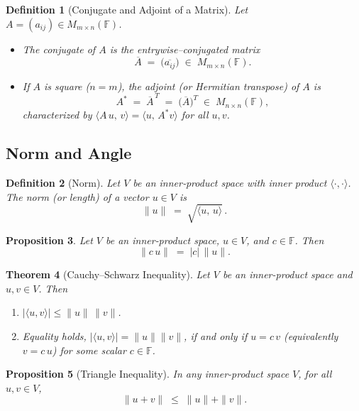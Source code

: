 \documentclass[12pt]{article}
\theoremstyle{break}             %
\newtheorem{thm}{Theorem}          %
\newtheorem{prop}[thm]{Proposition}%
\newtheorem{defn}[thm]{Definition}
\begin{document}
\begin{defn}[Conjugate and Adjoint of a Matrix]
Let \(A = (a_{ij})\in M_{m\times n}(\mathbb{F})\).  
\begin{itemize}
  \item The \emph{conjugate} of \(A\) is the entrywise–conjugated matrix
    \[
      \overline{A} \;=\;\bigl(\overline{a_{ij}}\bigr)
      \;\in\;M_{m\times n}(\mathbb{F}).
    \]
  \item If \(A\) is square (\(n=m\)), the \emph{adjoint} (or Hermitian transpose) of \(A\) is
    \[
      A^* \;=\;\overline{A}^{\,T}
      \;=\;\bigl(\overline{A}\bigr)^{T}
      \;\in\;M_{n\times n}(\mathbb{F}),
    \]
    characterized by \(\langle A\,u,\,v\rangle = \langle u,\,A^*v\rangle\) for all \(u,v\).
\end{itemize}
\end{defn}

\subsection{Norm and Angle}

\begin{defn}[Norm]
Let \(V\) be an inner‐product space with inner product \(\langle\cdot,\cdot\rangle\).  The \emph{norm} (or length) of a vector \(u\in V\) is
\[
\|u\|
\;=\;
\sqrt{\langle u,\,u\rangle}\,.
\]
\end{defn}

\begin{prop}
Let $V$ be an inner‐product space, $u\in V$, and $c\in\mathbb F$.  Then
\[
\|c\,u\| \;=\; |c|\,\|u\|.
\]
\end{prop}

\begin{thm}[Cauchy–Schwarz Inequality]
Let \(V\) be an inner-product space and \(u,v\in V\). Then
\begin{enumerate}
  \item \(\displaystyle \bigl\lvert\langle u,v\rangle\bigr\rvert \le \|u\|\,\|v\|\).
  \item Equality holds, \(\lvert\langle u,v\rangle\rvert = \|u\|\|v\|\), if and only if 
  \(u = c\,v\) (equivalently \(v = c\,u\)) for some scalar \(c\in\mathbb F\).
\end{enumerate}
\end{thm}

\begin{prop}[Triangle Inequality]
In any inner-product space \(V\), for all \(u,v\in V\),
\[
\|u+v\|\;\le\;\|u\| + \|v\|.
\]
\end{prop}
\end{document}
